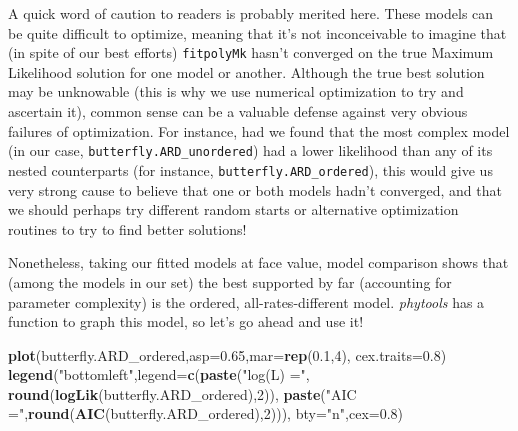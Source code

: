 \documentclass[fleqn,10pt,lineno]{wlpeerj} %
\newenvironment{Shaded}{\begin{snugshade}}{\end{snugshade}}
\newcommand{\AttributeTok}[1]{\textcolor[rgb]{0.13,0.29,0.53}{#1}}
\newcommand{\DecValTok}[1]{\textcolor[rgb]{0.00,0.00,0.81}{#1}}
\newcommand{\FloatTok}[1]{\textcolor[rgb]{0.00,0.00,0.81}{#1}}
\newcommand{\FunctionTok}[1]{\textcolor[rgb]{0.13,0.29,0.53}{\textbf{#1}}}
\newcommand{\NormalTok}[1]{#1}
\newcommand{\StringTok}[1]{\textcolor[rgb]{0.31,0.60,0.02}{#1}}
\begin{document}
A quick word of caution to readers is probably merited here. These models can be quite difficult to optimize, meaning that it's not inconceivable to imagine that (in spite of our best efforts) \texttt{fitpolyMk} hasn't converged on the true Maximum Likelihood solution for one model or another. Although the true best solution may be unknowable (this is why we use numerical optimization to try and ascertain it), common sense can be a valuable defense against very obvious failures of optimization. For instance, had we found that the most complex model (in our case, \texttt{butterfly.ARD\_unordered}) had a lower likelihood than any of its nested counterparts (for instance, \texttt{butterfly.ARD\_ordered}), this would give us very strong cause to believe that one or both models hadn't converged, and that we should perhaps try different random starts or alternative optimization routines to try to find better solutions!

Nonetheless, taking our fitted models at face value, model comparison shows that (among the models in our set) the best supported by far (accounting for parameter complexity) is the ordered, all-rates-different model. \emph{phytools} has a function to graph this model, so let's go ahead and use it!

\begin{Shaded}
\begin{Highlighting}[]
\FunctionTok{plot}\NormalTok{(butterfly.ARD\_ordered,}\AttributeTok{asp=}\FloatTok{0.65}\NormalTok{,}\AttributeTok{mar=}\FunctionTok{rep}\NormalTok{(}\FloatTok{0.1}\NormalTok{,}\DecValTok{4}\NormalTok{),}
  \AttributeTok{cex.traits=}\FloatTok{0.8}\NormalTok{)}
\FunctionTok{legend}\NormalTok{(}\StringTok{"bottomleft"}\NormalTok{,}\AttributeTok{legend=}\FunctionTok{c}\NormalTok{(}\FunctionTok{paste}\NormalTok{(}\StringTok{"log(L) ="}\NormalTok{,}
  \FunctionTok{round}\NormalTok{(}\FunctionTok{logLik}\NormalTok{(butterfly.ARD\_ordered),}\DecValTok{2}\NormalTok{)),}
  \FunctionTok{paste}\NormalTok{(}\StringTok{"AIC ="}\NormalTok{,}\FunctionTok{round}\NormalTok{(}\FunctionTok{AIC}\NormalTok{(butterfly.ARD\_ordered),}\DecValTok{2}\NormalTok{))),}
  \AttributeTok{bty=}\StringTok{"n"}\NormalTok{,}\AttributeTok{cex=}\FloatTok{0.8}\NormalTok{)}
\end{Highlighting}
\end{Shaded}
\end{document}
